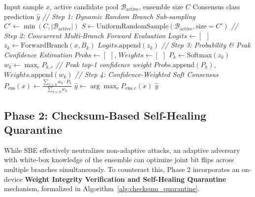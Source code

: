 \documentclass[conference,10pt]{IEEEtran}
\begin{document}
\begin{algorithm}[tb!]
\caption{Phase 1: Stochastic Branch Ensembling (SBE) Inference}
\label{alg:sbe_inference}
\begin{algorithmic}[1]
\renewcommand{\algorithmicrequire}{\textbf{Input:}}
\renewcommand{\algorithmicensure}{\textbf{Output:}}
\REQUIRE Input sample $x$, active candidate pool $\mathcal{B}_{\text{active}}$, ensemble size $C$
\ENSURE Consensus class prediction $\hat{y}$
\STATE \textit{// Step 1: Dynamic Random Branch Sub-sampling}
\STATE $C' \leftarrow \min(C, |\mathcal{B}_{\text{active}}|)$
\STATE $S \leftarrow \text{UniformRandomSample}(\mathcal{B}_{\text{active}}, \text{size}=C')$
\STATE \textit{// Step 2: Concurrent Multi-Branch Forward Evaluation}
\STATE $Logits \leftarrow [\:\:]$
    \STATE $z_k \leftarrow \text{ForwardBranch}(x, B_k)$
    \STATE $Logits\text{.append}(z_k)$
\ENDFOR
\STATE \textit{// Step 3: Probability \& Peak Confidence Estimation}
\STATE $Probs \leftarrow [\:\:]$, $Weights \leftarrow [\:\:]$
    \STATE $P_k \leftarrow \text{Softmax}(z_k)$
    \STATE $w_k \leftarrow \max_c P_{k, c}$ \quad \textit{// Peak top-1 confidence weight}
    \STATE $Probs\text{.append}(P_k)$, $Weights\text{.append}(w_k)$
\ENDFOR
\STATE \textit{// Step 4: Confidence-Weighted Soft Consensus}
\STATE $P_{\text{ens}}(x) \leftarrow \frac{\sum_{k \in S} w_k \cdot P_k}{\sum_{k \in S} w_k}$
\STATE $\hat{y} \leftarrow \arg\max_c P_{\text{ens}, c}(x)$
\RETURN $\hat{y}$
\end{algorithmic}
\end{algorithm}

\subsection{Phase 2: Checksum-Based Self-Healing Quarantine}
While SBE effectively neutralizes non-adaptive attacks, an adaptive adversary with white-box knowledge of the ensemble can optimize joint bit flips across multiple branches simultaneously. To counteract this, Phase 2 incorporates an on-device \textbf{Weight Integrity Verification and Self-Healing Quarantine} mechanism, formalized in Algorithm~\ref{alg:checksum_quarantine}.
\end{document}
